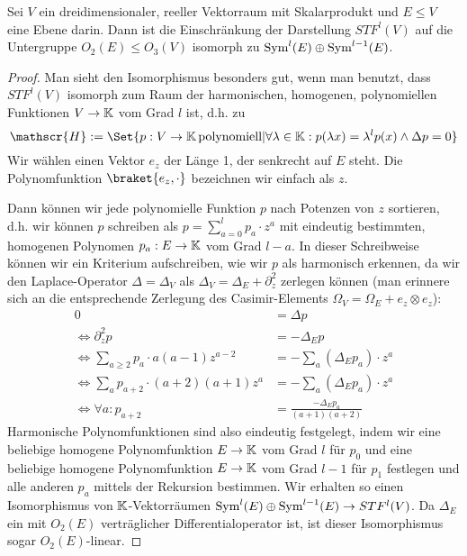 
\begin{lemma}
Sei $V$ ein dreidimensionaler, reeller Vektorraum mit Skalarprodukt und $E\leq V$ eine Ebene darin. Dann ist die Einschränkung der Darstellung $STF^l(V)$ auf die Untergruppe $O_2(E) \leq O_3(V)$ isomorph zu $\operatorname{Sym}^l(E) \oplus \operatorname{Sym}^{l-1}(E)$.
\end{lemma}
\begin{proof}
Man sieht den Isomorphismus besonders gut, wenn man benutzt, dass $STF^l(V)$ isomorph zum Raum der harmonischen, homogenen, polynomiellen Funktionen $V\to\mathbb{K}$ vom Grad $l$ ist, d.h. zu
\[\mathscr{H} := \Set{p: V\to\IK \,\text{polynomiell} | \forall\lambda\in\IK: p(\lambda x) = \lambda^l p(x) \wedge \Delta p = 0}\]
Wir wählen einen Vektor $e_z$ der Länge 1, der senkrecht auf $E$ steht. Die Polynomfunktion $\braket{e_z,\cdot}$ bezeichnen wir einfach als $z$.

Dann können wir jede polynomielle Funktion $p$ nach Potenzen von $z$ sortieren, d.h. wir können $p$ schreiben als $p = \sum_{a=0}^l p_a \cdot z^a$ mit eindeutig bestimmten, homogenen Polynomen $p_a: E\to\mathbb{K}$ vom Grad $l-a$. In dieser Schreibweise können wir ein Kriterium aufschreiben, wie wir $p$ als harmonisch erkennen, da wir den Laplace-Operator $\Delta=\Delta_V$ als $\Delta_V = \Delta_E + \partial_z^2$ zerlegen können (man erinnere sich an die entsprechende Zerlegung des Casimir-Elements $\Omega_V=\Omega_E + e_z\otimes e_z$):
\begin{align*}
0 &= \Delta p \\
\iff \partial_z^2 p &= -\Delta_ E p \\
\iff \sum_{a\geq 2} p_a \cdot a(a-1)z^{a-2} &= -\sum_a (\Delta_E p_a)\cdot z^a \\
\iff \sum_a p_{a+2}\cdot  (a+2)(a+1)z^a &= -\sum_a (\Delta_E p_a)\cdot z^a \\
\iff \forall a: p_{a+2} &= \frac{-\Delta_E p_a}{(a+1)(a+2)}
\end{align*}
Harmonische Polynomfunktionen sind also eindeutig festgelegt, indem wir eine beliebige homogene Polynomfunktion $E\to\mathbb{K}$ vom Grad $l$ für $p_0$ und eine beliebige homogene Polynomfunktion $E\to\mathbb{K}$ vom Grad $l-1$ für $p_1$ festlegen und alle anderen $p_a$ mittels der Rekursion bestimmen. Wir erhalten so einen Isomorphismus von $\mathbb{K}$-Vektorräumen $\operatorname{Sym}^l(E) \oplus \operatorname{Sym}^{l-1}(E) \to STF^l(V)$. Da $\Delta_E$ ein mit $O_2(E)$ verträglicher Differentialoperator ist, ist dieser Isomorphismus sogar $O_2(E)$-linear.
\end{proof}

